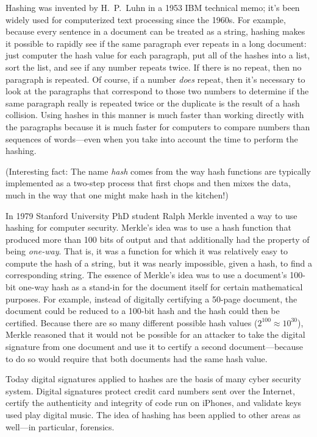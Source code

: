 Hashing was invented by H.\ P.\ Luhn in a 1953 IBM technical memo;
it's been widely used for computerized text processing since the
1960s. For example, because every sentence in a document can be
treated as a string, hashing makes it possible to rapidly see if the
same paragraph ever repeats in a long document: just computer the hash
value for each paragraph, put all of the hashes into a list, sort the
list, and see if any number repeats twice. If there is no repeat, then
no paragraph is repeated. Of course, if a number \emph{does} repeat,
then it's necessary to look at the paragraphs that correspond to those
two numbers to determine if the same paragraph really is repeated
twice or the duplicate is the result of a hash collision. Using hashes
in this manner is much faster than working directly with the
paragraphs because it is much faster for computers to compare numbers
than sequences of words---even when you take into account the time to
perform the hashing.

(Interesting fact: The name \emph{hash} comes from the way hash functions are typically
implemented as a two-step process that first chops and then mixes the
data, much in the way that one might make hash in the kitchen!)

In 1979 Stanford University PhD student Ralph Merkle invented a way to use
hashing for computer security\citep{merkle:79}. Merkle's idea was to
use a hash
function that produced more than 100 bits of output and that
additionally had the property of being \emph{one-way}. That is, it was
a function for which it was relatively easy to compute the hash of a
string, but it was nearly impossible, given a hash, to find a
corresponding string. The essence of Merkle's idea was to use a
document's 100-bit one-way hash as a stand-in for the document itself
for certain mathematical purposes. For example, instead of digitally
certifying a 50-page document, the document could be reduced to a
100-bit hash and the hash could then be certified. Because there are so many different possible hash values
($2^{100}\approx10^{30}$), Merkle reasoned that it would not be
possible for an attacker to take the digital signature from one document and use it
to certify a second document---because to do so would require that
both documents had the same hash value.

Today digital signatures applied to hashes are
the basis of many cyber security system. Digital signatures protect
credit card numbers sent over the Internet, certify the authenticity
and integrity of code run on iPhones, and validate keys used play
digital music. The idea of hashing has been applied to other areas as
well---in particular, forensics.

